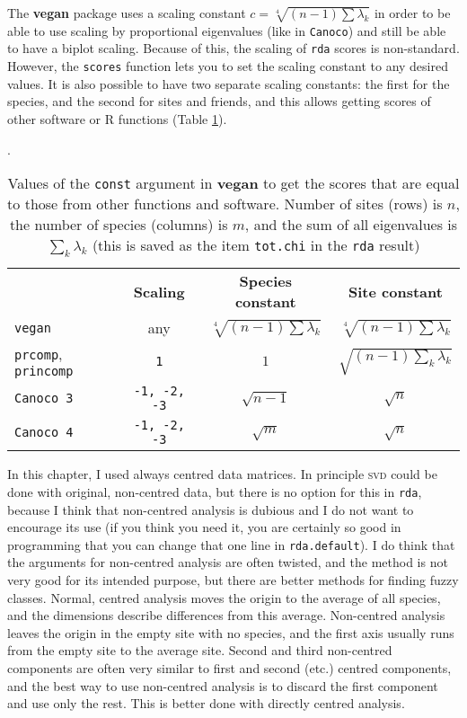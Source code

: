 \documentclass[a4paper,10pt]{amsart}
\begin{document}
The \textbf{vegan} package uses a scaling constant $c = \sqrt[4]{(n-1)
  \sum \lambda_k}$ in order to be able to use scaling by proportional
eigenvalues (like in \texttt{Canoco}) and still be able to have a
biplot scaling. Because of this, the scaling of \texttt{rda} scores is
non-standard. However, the \texttt{scores} function lets you to set
the scaling constant to any desired values. It is also possible to
have two separate scaling constants: the first for the species, and
the second for sites and friends, and this allows getting scores of
other software or R functions (Table \ref{tab:rdaconst}). 
\begin{table}
  \caption{\label{tab:rdaconst} Values of the \texttt{const} argument in
    \textbf{vegan} to get the scores that are equal to those from
    other functions and software. Number of sites (rows) is $n$, 
    the number of species (columns) is $m$, and the sum of all
    eigenvalues is $\sum_k \lambda_k$ (this is saved as the item
    \texttt{tot.chi} in the \texttt{rda} result)}.
\begin{tabular}{lccc}
& \textbf{Scaling} &\textbf{Species constant} & \textbf{Site constant} \\
\texttt{vegan} & any  & $\sqrt[4]{(n-1) \sum \lambda_k}$ & $\sqrt[4]{(n-1) \sum \lambda_k}$\\
\texttt{prcomp}, \texttt{princomp} & \texttt{1} & $1$ & $\sqrt{(n-1) \sum_k \lambda_k}$\\
\texttt{Canoco 3} & \texttt{-1, -2, -3} & $\sqrt{n-1}$ & $\sqrt{n}$\\
\texttt{Canoco 4} & \texttt{-1, -2, -3} & $\sqrt{m}$ & $\sqrt{n}$
\end{tabular}
\end{table}

In this chapter, I used always centred data matrices.  In principle
\textsc{svd} could be done with original, non-centred data, but
there is no option for this in \texttt{rda}, because I think that
non-centred analysis is dubious and I do not want to encourage its use
(if you think you need it, you are certainly so good in programming
that you can change that one line in \texttt{rda.default}).  I do
think that the arguments for non-centred analysis are often twisted,
and the method is not very good for its intended purpose, but there
are better methods for finding fuzzy classes.  Normal, centred
analysis moves the origin to the average of all species, and the
dimensions describe differences from this average.  Non-centred
analysis leaves the origin in the empty site with no species, and the
first axis usually runs from the empty site to the average
site. Second and third non-centred components are often very similar
to first and second (etc.) centred components, and the best way to use
non-centred analysis is to discard the first component and use only
the rest. This is better done with directly centred analysis.
\end{document}
